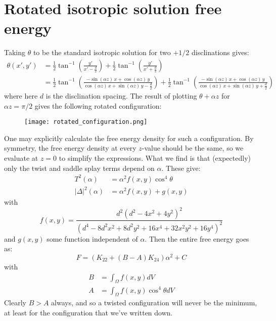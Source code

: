 \documentclass[reqno]{article}
\begin{document}
\section{Rotated isotropic solution free energy}

Taking $\theta$ to be the standard isotropic solution for two $+1/2$ disclinations gives:
\begin{equation} \label{eq:transformed-director-angle}
\begin{split}
    \theta(x', y')
    &=
    \frac12 \tan^{-1} \left( \frac{y'}{x' - \frac{d}{2}} \right)
    + \frac12 \tan^{-1} \left( \frac{y'}{x' + \frac{d}{2}} \right) \\
    &=
    \frac12 \tan^{-1} \left( \frac{-\sin(\alpha z)\, x + \cos(\alpha z) \, y}
                             {\cos(\alpha z) \, x + \sin(\alpha z) \, y - \frac{d}{2}} \right)
    + \frac12 \tan^{-1} \left( \frac{-\sin(\alpha z)\, x + \cos(\alpha z) \, y}
                             {\cos(\alpha z) \, x + \sin(\alpha z) \, y + \frac{d}{2}} \right)
\end{split}
\end{equation}
where here $d$ is the disclination spacing.
The result of plotting $\theta + \alpha z$ for $\alpha z = \pi / 2$ gives the following rotated configuration:
\begin{figure}[h]
    \centering
    \texttt{[image: rotated\_configuration.png]}
\end{figure}

One may explicitly calculate the free energy density for such a configuration.
By symmetry, the free energy density at every $z$-value should be the same, so we evaluate at $z = 0$ to simplify the expressions.
What we find is that (expectedly) only the twist and saddle splay terms depend on $\alpha$.
These give:
\begin{align}
    T^2(\alpha)
    &=
    \alpha^2 
    f(x, y)
    \cos^4 \theta \\
    \left|\Delta\right|^2(\alpha)
    &=
    \alpha^2 
    f(x, y)
    + g(x, y)
\end{align}
with
\begin{equation}
    f(x, y)
    =
    \frac{d^2 \left(d^2 - 4x^2 + 4y^2\right)^2}{\left(d^4 - 8 d^2 x^2 + 8 d^2 y^2 + 16x^4 + 32x^2 y^2 + 16y^4 \right)^2}
\end{equation}
and $g(x, y)$ some function independent of $\alpha$.
Then the entire free energy goes as:
\begin{equation}
    F 
    = 
    \left(K_{22} + (B - A) K_{24} \right) \alpha^2
    + C
\end{equation}
with
\begin{equation}
\begin{split}
    B
    &=
    \int_{\Omega}
    f(x, y) dV \\
    A
    &=
    \int_{\Omega}
    f(x, y) \cos^4\theta dV
\end{split}
\end{equation}
Clearly $B > A$ always, and so a twisted configuration will never be the minimum, at least for the configuration that we've written down.
\end{document}
